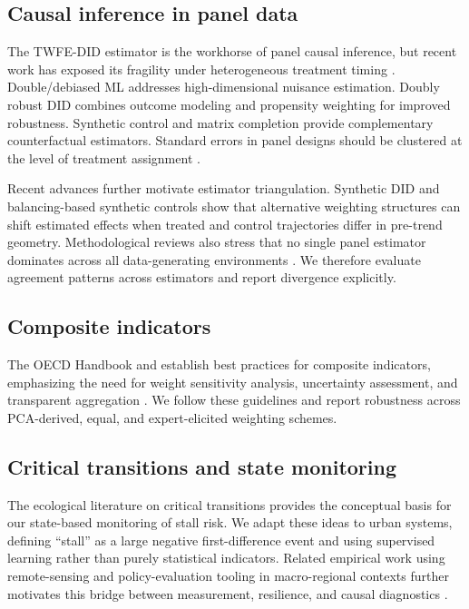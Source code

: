 \documentclass[11pt,a4paper]{article}
\begin{document}
\subsection{Causal inference in panel data}
The TWFE-DID estimator \citep{angrist2009mostly} is the workhorse of panel causal inference, but recent work has exposed its fragility under heterogeneous treatment timing \citep{goodmanbacon2021did,dechaisemartin2020two,callaway2021did,sun2021event,borusyak2024revisiting,roth2023parallel}.
Double/debiased ML \citep{chernozhukov2018dml} addresses high-dimensional nuisance estimation.
Doubly robust DID \citep{santanna2020dr} combines outcome modeling and propensity weighting for improved robustness.
Synthetic control \citep{abadie2010synthetic} and matrix completion \citep{athey2021matrix} provide complementary counterfactual estimators.
Standard errors in panel designs should be clustered at the level of treatment assignment \citep{abadie2023should,cameron2008bootstrap}.

Recent advances further motivate estimator triangulation.
Synthetic DID \citep{arkhangelsky2021sdid} and balancing-based synthetic controls \citep{doudchenko2016balancing} show that alternative weighting structures can shift estimated effects when treated and control trajectories differ in pre-trend geometry.
Methodological reviews also stress that no single panel estimator dominates across all data-generating environments \citep{abadie2021using}.
We therefore evaluate agreement patterns across estimators and report divergence explicitly.

\subsection{Composite indicators}
The OECD Handbook \citep{oecd2008handbook} and \citet{nardo2005tools} establish best practices for composite indicators, emphasizing the need for weight sensitivity analysis, uncertainty assessment, and transparent aggregation \citep{greco2019composite}.
We follow these guidelines and report robustness across PCA-derived, equal, and expert-elicited weighting schemes.

\subsection{Critical transitions and state monitoring}
The ecological literature on critical transitions \citep{scheffer2009early,dakos2012methods,lenton2008tipping} provides the conceptual basis for our state-based monitoring of stall risk.
We adapt these ideas to urban systems, defining ``stall'' as a large negative first-difference event and using supervised learning rather than purely statistical indicators.
Related empirical work using remote-sensing and policy-evaluation tooling in macro-regional contexts further motivates this bridge between measurement, resilience, and causal diagnostics \citep{henderson2018measuring,kreif2024causal,dellagostino2017world}.
\end{document}
